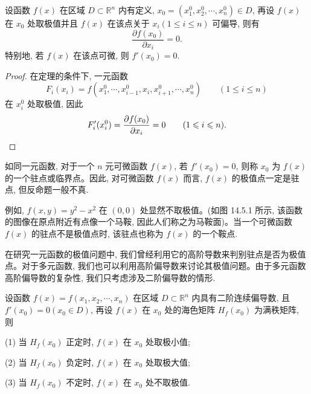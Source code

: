\begin{theorem}\label{theorem:ma-14-5-1}
设函数 $f(x)$ 在区域 $D\subset\mathbb R^n$ 内有定义, $x_0=(x_1^0,x_2^0,\cdots,x_n^0)\in D$, 再设 $f(x)$ 在 $x_0$ 处取极值并且 $f(x)$ 在该点关于 $x_i(1\leqslant i\leqslant n)$ 可偏导, 则有
\[
  \frac{\partial f(x_0)}{\partial x_i}=0.
\]
特别地, 若 $f(x)$ 在该点可微, 则 $f'(x_0)=0$.
\end{theorem}


\begin{proof}
在定理的条件下, 一元函数
\[
  F_i(x_i)=f(x_1^0,\cdots,x_{i-1}^0,x_i,x_{i+1}^0,\cdots,x_n^0)
  \qquad (1\leqslant i\leqslant n)
\]
在 $x_i^0$ 处取极值, 因此
\[
  F_i'(x_i^0)=\frac{\partial f(x_0)}{\partial x_i}=0
  \qquad (1\leqslant i\leqslant n).
\qedhere
\]
\end{proof}


如同一元函数, 对于一个 $n$ 元可微函数 $f(x)$, 若 $f'(x_0)=0$, 则称 $x_0$ 为 $f(x)$ 的一个驻点或临界点。因此, 对可微函数 $f(x)$ 而言, $f(x)$ 的极值点一定是驻点, 但反命题一般不真.

例如, $f(x,y)=y^2-x^2$ 在 $(0,0)$ 处显然不取极值。(如图 14.5.1 所示, 该函数的图像在原点附近有点像一个马鞍, 因此人们称之为马鞍面)。当一个可微函数 $f(x)$ 的驻点不是极值点时, 该驻点也称为 $f(x)$ 的一个鞍点.

在研究一元函数的极值问题中, 我们曾经利用它的高阶导数来判别驻点是否为极值点。对于多元函数, 我们也可以利用高阶偏导数来讨论其极值问题。由于多元函数高阶偏导数的复杂性, 我们只考虑涉及二阶偏导数的情形.

\begin{theorem}\label{theorem:ma-14-5-2}
设函数 $f(x)=f(x_1,x_2,\cdots,x_n)$ 在区域 $D\subset\mathbb R^n$ 内具有二阶连续偏导数, 且 $f'(x_0)=0(x_0\in D)$, 再设 $f(x)$ 在 $x_0$ 处的海色矩阵 $H_f(x_0)$ 为满秩矩阵, 则
\end{theorem}

\noindent (1) 当 $H_f(x_0)$ 正定时, $f(x)$ 在 $x_0$ 处取极小值;

\noindent (2) 当 $H_f(x_0)$ 负定时, $f(x)$ 在 $x_0$ 处取极大值;

\noindent (3) 当 $H_f(x_0)$ 不定时, $f(x)$ 在 $x_0$ 处不取极值.

